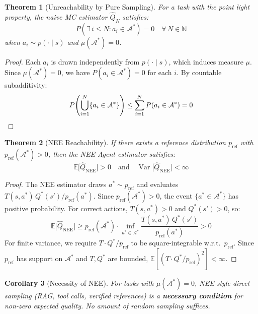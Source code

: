 \documentclass[11pt,twocolumn]{article}
\newtheorem{theorem}{Theorem}[section]
\newtheorem{corollary}[theorem]{Corollary}
\theoremstyle{definition}
\newcommand{\E}{\mathbb{E}}
\newcommand{\Var}{\operatorname{Var}}
\newcommand{\N}{\mathbb{N}}
\newcommand{\Astar}{\mathcal{A}^{\ast}}
\newcommand{\pref}{p_{\text{ref}}}
\begin{document}
\begin{theorem}[Unreachability by Pure Sampling]\label{thm:unreachable}
For a task with the point light property,
the naive MC estimator $\hat{Q}_N$ satisfies:
\begin{equation}\label{eq:unreachable}
  P\!\left(\exists\, i \leq N : a_i \in \Astar\right) = 0
  \quad \forall\, N \in \N
\end{equation}
when $a_i \sim p(\cdot \mid s)$ and $\mu(\Astar) = 0$.
\end{theorem}

\begin{proof}
Each $a_i$ is drawn independently from $p(\cdot \mid s)$,
which induces measure $\mu$.
Since $\mu(\Astar) = 0$, we have $P(a_i \in \Astar) = 0$ for each $i$.
By countable subadditivity:
\begin{equation*}
  P\!\left(\bigcup_{i=1}^{N} \{a_i \in \Astar\}\right)
    \leq \sum_{i=1}^{N} P(a_i \in \Astar) = 0
    \qedhere
\end{equation*}
\end{proof}

\begin{theorem}[NEE Reachability]\label{thm:nee-reach}
If there exists a reference distribution $\pref$ with
$\pref(\Astar) > 0$, then the NEE-Agent estimator satisfies:
\begin{equation}\label{eq:nee-reach}
  \E\bigl[\hat{Q}_{\text{NEE}}\bigr] > 0
  \quad \text{and} \quad
  \Var\bigl[\hat{Q}_{\text{NEE}}\bigr] < \infty
\end{equation}
\end{theorem}

\begin{proof}
The NEE estimator draws $a^* \sim \pref$ and evaluates
$T(s, a^*)\,Q^*(s')/\pref(a^*)$.
Since $\pref(\Astar) > 0$, the event $\{a^* \in \Astar\}$ has positive probability.
For correct actions, $T(s, a^*) > 0$ and $Q^*(s') > 0$, so:
\begin{equation*}
  \E\bigl[\hat{Q}_{\text{NEE}}\bigr]
    \geq \pref(\Astar) \cdot \inf_{a^* \in \Astar}
      \frac{T(s, a^*)\,Q^*(s')}{\pref(a^*)} > 0
\end{equation*}
For finite variance, we require $T \cdot Q^* / \pref$ to be square-integrable
w.r.t.\ $\pref$.
Since $\pref$ has support on $\Astar$ and $T, Q^*$ are bounded,
$\E[(T \cdot Q^* / \pref)^2] < \infty$.
\end{proof}

\begin{corollary}[Necessity of NEE]\label{cor:nee-necessary}
For tasks with $\mu(\Astar) = 0$,
NEE-style direct sampling (RAG, tool calls, verified references)
is a \textbf{necessary condition} for non-zero expected quality.
No amount of random sampling suffices.
\end{corollary}
\end{document}

